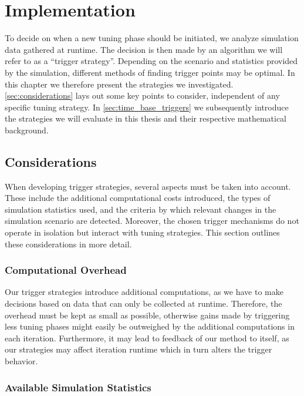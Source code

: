 \chapter[Implementation]{Implementation}
\label{cp:implementation}

{
	\parindent0pt
	To decide on when a new tuning phase should be initiated, we analyze simulation data gathered at runtime. The decision is then made by an algorithm we will refer to as a \enquote{trigger strategy}. Depending on the scenario and statistics provided by the simulation, different methods of finding trigger points may be optimal. In this chapter we therefore present the strategies we investigated. \autoref{sec:considerations} lays out some key points to consider, independent of any specific tuning strategy. In \autoref{sec:time_base_triggers} we subsequently introduce the strategies we will evaluate in this thesis and their respective mathematical background.
}

\section{Considerations}
\label{sec:considerations}
When developing trigger strategies, several aspects must be taken into account. These include the additional computational costs introduced, the types of simulation statistics used, and the criteria by which relevant changes in the simulation scenario are detected. Moreover, the chosen trigger mechanisms do not operate in isolation but interact with tuning strategies. This section outlines these considerations in more detail.

\subsection{Computational Overhead}
Our trigger strategies introduce additional computations, as we have to make decisions based on data that can only be collected at runtime. Therefore, the overhead must be kept as small as possible, otherwise gains made by triggering less tuning phases might easily be outweighed by the additional computations in each iteration. Furthermore, it may lead to feedback of our method to itself, as our strategies may affect iteration runtime which in turn alters the trigger behavior.

\subsection{Available Simulation Statistics}
\label{sec:avail_sim_stats}

